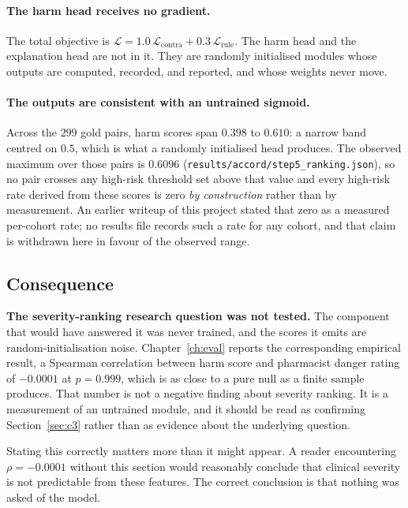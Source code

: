 \paragraph{The harm head receives no gradient.} The total objective is
$\mathcal{L} = 1.0\,\mathcal{L}_{\text{contra}} +
0.3\,\mathcal{L}_{\text{rule}}$. The harm head and the explanation head are not
in it. They are randomly initialised modules whose outputs are computed,
recorded, and reported, and whose weights never move.

\paragraph{The outputs are consistent with an untrained sigmoid.} Across the
$299$ gold pairs, harm scores span $0.398$ to $0.610$: a narrow band centred on
$0.5$, which is what a randomly initialised head produces. The observed maximum
over those pairs is $0.6096$
(\texttt{results/accord/step5\_ranking.json}), so no pair crosses any high-risk
threshold set above that value and every high-risk rate derived from these scores
is zero \emph{by construction} rather than by measurement. An earlier writeup of
this project stated that zero as a measured per-cohort rate; no results file
records such a rate for any cohort, and that claim is withdrawn here in favour of
the observed range.

\subsection{Consequence}

\textbf{The severity-ranking research question was not tested.} The component
that would have answered it was never trained, and the scores it emits are
random-initialisation noise. Chapter~\ref{ch:eval} reports the corresponding
empirical result, a Spearman correlation between harm score and pharmacist
danger rating of $-0.0001$ at $p = 0.999$, which is as close to a pure null as a
finite sample produces. That number is not a negative finding about severity
ranking. It is a measurement of an untrained module, and it should be read as
confirming Section~\ref{sec:c3} rather than as evidence about the underlying
question.

Stating this correctly matters more than it might appear. A reader encountering
$\rho = -0.0001$ without this section would reasonably conclude that clinical
severity is not predictable from these features. The correct conclusion is that
nothing was asked of the model.

